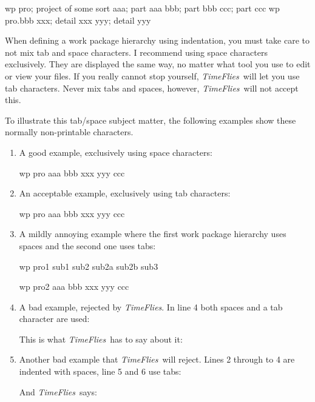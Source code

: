 \documentclass[11pt]{article}
\newcommand{\timeflies}{\emph{TimeFlies}}
\begin{document}
\begin{inputfile}
wp pro; project of some sort
    aaa; part aaa
    bbb; part bbb
    ccc; part ccc
wp pro.bbb
    xxx; detail xxx
    yyy; detail yyy
\end{inputfile}

When defining a work package hierarchy using indentation, you must take care to not mix tab and space characters. I recommend using space characters exclusively. They are displayed the same way, no matter what tool you use to edit or view your files. If you really cannot stop yourself, \timeflies\ will let you use tab characters. Never mix tabs and spaces, however, \timeflies\ will not accept this.

To illustrate this tab/space subject matter, the following examples show these normally non-printable characters.

\begin{enumerate}

\item A good example, exclusively using space characters:

\begin{inputfilespaces}
wp pro
    aaa
    bbb
        xxx
        yyy
    ccc
\end{inputfilespaces}

\item An acceptable example, exclusively using tab characters:

\begin{inputfilespaces}
wp pro
	aaa
	bbb
		xxx
		yyy
	ccc
\end{inputfilespaces}

\item A mildly annoying example where the first work package hierarchy uses spaces and the second one uses tabs:

\begin{inputfilespaces}
wp pro1
    sub1
    sub2
        sub2a
        sub2b
    sub3

wp pro2
	aaa
	bbb
		xxx
		yyy
	ccc
\end{inputfilespaces}

\item A bad example, rejected by \timeflies. In line 4 both spaces and a tab character are used:



This is what \timeflies\ has to say about it:



\item Another bad example that \timeflies\ will reject. Lines 2 through to 4 are indented with spaces, line 5 and 6 use tabs:



And \timeflies\ says:



\end{enumerate}
\end{document}
